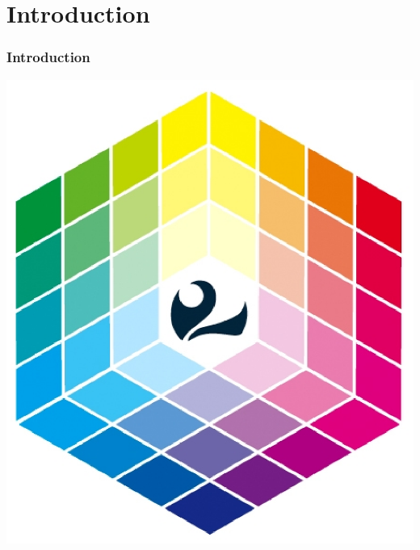 \section{Introduction}

\begin{frame}
\frametitle{Introduction}

	\begin{center} \includegraphics[scale=0.4]{img/logoUm2.eps} \end{center}

\end{frame}

